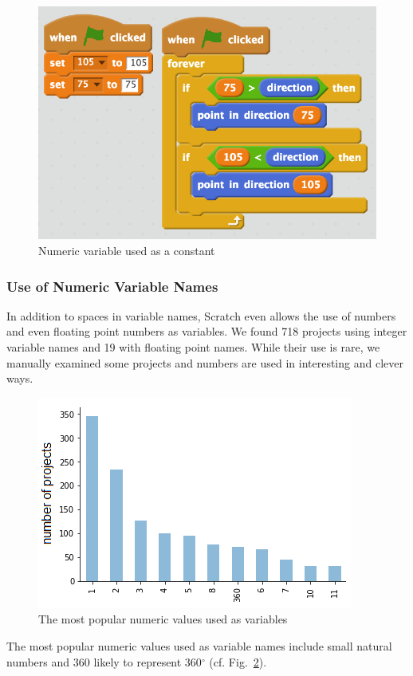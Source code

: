 \documentclass[conference]{IEEEtran}
\begin{document}
\begin{figure}[tb]
	\begin{center}
		\includegraphics[scale=0.46]{fig/constants}
		\caption{Numeric variable used as a constant}
		\label{fig:constants}
	\end{center}
\end{figure} 	

\subsubsection{Use of Numeric Variable Names}
In addition to spaces in variable names, Scratch even allows the use of numbers and even floating point numbers as variables. We found 718 projects using integer variable names and 19 with floating point names. While their use is rare, we manually examined some projects and numbers are used in interesting and clever ways. 
\begin{figure}[tb]
	\begin{center}
		\includegraphics[scale=0.6]{fig/project/numeric}
		\caption{The most popular numeric values used as variables}
		\label{fig:numeric}
	\end{center}
\end{figure} 
The most popular numeric values used as variable names include small natural numbers and 360 likely to represent 360$^\circ$ (cf. Fig.~\ref{fig:numeric}).
\end{document}
